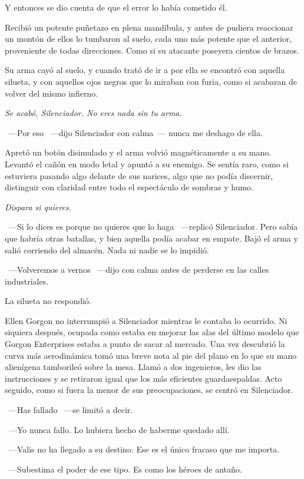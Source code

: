 Y entonces se dio cuenta de que el error lo había cometido él.

Recibió un potente puñetazo en plena mandíbula, y antes de pudiera reaccionar un montón de ellos lo tumbaron al suelo, cada uno más potente que el anterior, proveniente de todas direcciones. Como si su atacante poseyera cientos de brazos.

Su arma cayó al suelo, y cuando trató de ir a por ella se encontró con aquella silueta, y con aquellos ojos negros que lo miraban con furia, como si acabaran de volver del mismo infierno.

\emph{Se acabó, Silenciador. No eres nada sin tu arma.}

~---Por eso ~---dijo Silenciador con calma~--- nunca me deshago de ella.

Apretó un botón disimulado y el arma volvió magnéticamente a su mano. Levantó el cañón en modo letal y apuntó a su enemigo. Se sentía raro, como si estuviera pasando algo delante de sus narices, algo que no podía discernir, distinguir con claridad entre todo el espectáculo de sombras y humo.

\emph{Dispara si quieres.}

~---Si lo dices es porque no quieres que lo haga ~---replicó Silenciador. Pero sabía que habría otras batallas, y bien aquella podía acabar en empate. Bajó el arma y salió corriendo del almacén. Nada ni nadie se lo impidió.

~---Volveremos a vernos ~---dijo con calma antes de perderse en las calles industriales.

La silueta no respondió.

\bigskip\noindent
Ellen Gorgon no interrumpió a Silenciador mientras le contaba lo ocurrido. Ni siquiera después, ocupada como estaba en mejorar las alas del último modelo que Gorgon Enterprises estaba a punto de sacar al mercado. Una vez descubrió la curva más aerodinámica tomó una breve nota al pie del plano en lo que su mano alienígena tamborileó sobre la mesa. Llamó a dos ingenieros, les dio las instrucciones y se retiraron igual que los más eficientes guardaespaldas. Acto seguido, como si fuera la menor de sus preocupaciones, se centró en Silenciador.

~---Has fallado ~---se limitó a decir.

~---Yo nunca fallo. Lo hubiera hecho de haberme quedado allí.

~---Valis no ha llegado a su destino. Ese es el único fracaso que me importa.

~---Subestima el poder de ese tipo. Es como los héroes de antaño.

